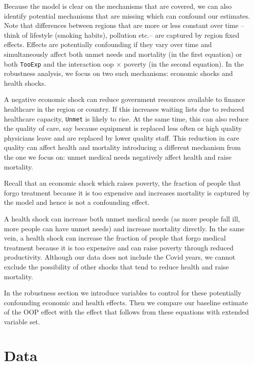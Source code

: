 \documentclass[a4paper,12pt]{article}
\begin{document}
Because the model is clear on the mechanisms that are covered, we can also identify potential mechanisms that are missing which can confound our estimates. Note that differences between regions that are more or less constant over time --think of lifestyle (smoking habits), pollution etc.-- are captured by region fixed effects. Effects are potentially confounding if they vary over time and simultaneously affect both unmet needs and mortality (in the first equation) or both \texttt{TooExp} and the interaction oop \(\times\) poverty (in the second equation).
In the robustness analysis, we focus on two such mechanisms: economic shocks and health shocks.

A negative economic shock can reduce government resources available to finance healthcare in the region or country. If this increases waiting lists due to reduced healthcare capacity, \texttt{Unmet} is likely to rise. At the same time, this can also reduce the quality of care, say because equipment is replaced less often or high quality physicians leave and are replaced by lower quality staff. This reduction in care quality can affect health and mortality introducing a different mechanism from the one we focus on: unmet medical needs negatively affect health and raise mortality.

Recall that an economic shock which raises poverty, the fraction of people that forgo treatment because it is too expensive and increases mortality is captured by the model and hence is not a confounding effect.

A health shock can increase both unmet medical needs (as more people fall ill, more people can have unmet needs) and increase mortality directly. In the same vein, a health shock can increase the fraction of people that forgo medical treatment because it is too expensive and can raise poverty through reduced productivity. Although our data does not include the Covid years, we cannot exclude the possibility of other shocks that tend to reduce health and raise mortality.

In the robustness section we introduce variables to control for these potentially confounding economic and health effects. Then we compare our baseline estimate of the OOP effect with the effect that follows from these equations with extended variable set. 



\section{Data}
\label{sec:orgf183b39}
\end{document}
